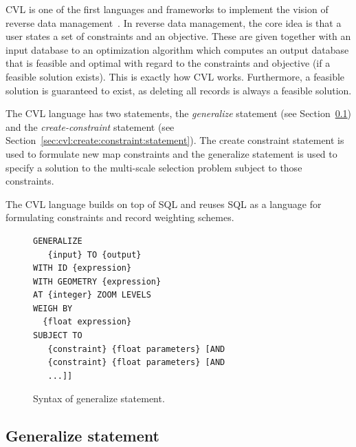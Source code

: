 \documentclass[11pt, oneside]{report}
\begin{document}
CVL is one of the first languages and frameworks to implement the vision of reverse data management~\cite{meliou2011reverse}. In reverse data management, the core idea is that a user states a set of constraints and an objective. These are given together with an input database to an optimization algorithm which computes an output database that is feasible and optimal with regard to the constraints and objective (if a feasible solution exists). This is exactly how CVL works. Furthermore, a feasible solution is guaranteed to exist, as deleting all records is always a feasible solution.

The CVL language has two statements, the \emph{generalize} statement (see Section~\ref{sec:cvl:generalize:statement}) and the \emph{create-constraint} statement (see Section~\ref{sec:cvl:create:constraint:statement}). The create constraint statement is used to formulate new map constraints and the generalize statement is used to specify a solution to the multi-scale selection problem subject to those constraints.

The CVL language builds on top of SQL and reuses SQL as a language for formulating constraints and record weighting schemes.

\begin{figure}[!t]
\begin{center}
\begin{lstlisting}
GENERALIZE 
   {input} TO {output}
WITH ID {expression}
WITH GEOMETRY {expression}
AT {integer} ZOOM LEVELS
WEIGH BY
  {float expression}
SUBJECT TO 
   {constraint} {float parameters} [AND
   {constraint} {float parameters} [AND
   ...]]
\end{lstlisting}
\vspace*{-1ex}
\caption{Syntax of generalize statement.}
\label{fig:cvl:generalize:syntax}
\end{center}
\vspace*{-4ex}
\end{figure}

\subsection{Generalize statement}
\label{sec:cvl:generalize:statement}
\end{document}
